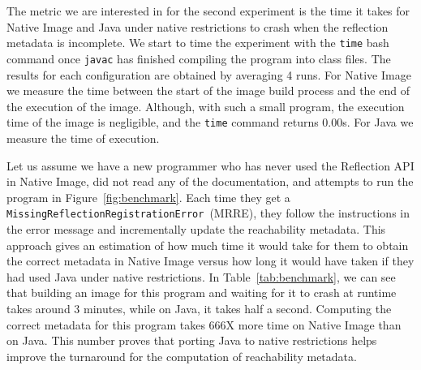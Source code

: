 
The metric we are interested in for the second experiment is the time it takes for Native Image and Java under native restrictions to crash when the reflection metadata is incomplete.
We start to time the experiment with the \verb|time| bash command once \verb|javac| has finished compiling the program into class files. 
The results for each configuration are obtained by averaging 4 runs.
For Native Image we measure the time between the start of the image build process and the end of the execution of the image. Although, with such a small program, the execution time of the image is negligible, and the \verb|time| command returns 0.00s. For Java we measure the time of execution.

Let us assume we have a new programmer who has never used the Reflection API in Native Image, did not read any of the documentation, and attempts to run the program in Figure~\ref{fig:benchmark}. Each time they get a \verb|MissingReflectionRegistrationError|~(MRRE), they follow the instructions in the error message and incrementally update the reachability metadata.
This approach gives an estimation of how much time it would take for them to obtain the correct metadata in Native Image versus how long it would have taken if they had used Java under native restrictions. 
In Table~\ref{tab:benchmark}, we can see that building an image for this program and waiting for it to crash at runtime takes around 3 minutes, while on Java, it takes half a second. Computing the correct metadata for this program takes 666X more time on Native Image than on Java.
This number proves that porting Java to native restrictions helps improve the turnaround for the computation of reachability metadata.


